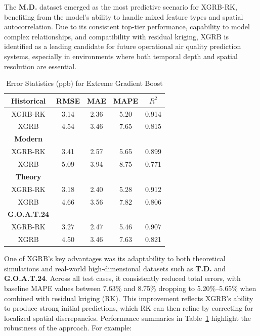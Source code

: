 The \textbf{M.D.} dataset emerged as the most predictive scenario for XGRB-RK, benefiting from the model’s ability to handle mixed feature types and spatial autocorrelation. Due to its consistent top-tier performance, capability to model complex relationships, and compatibility with residual kriging, XGRB is identified as a leading candidate for future operational air quality prediction systems, especially in environments where both temporal depth and spatial resolution are essential.
\begin{table}[h!]
    \centering
        \begin{tabular}{||c|cccc||}
            \hline
            \textbf{Historical} & \textbf{RMSE} & \textbf{MAE} & \textbf{MAPE} & \textbf{$R^{2}$} \\[3pt]
            \hline
            XGRB-RK & 3.14 & 2.36 &  5.20 & 0.914 \\[3pt]
              XGRB & 4.54 & 3.46 &  7.65 & 0.815 \\
            \hline
            \textbf{Modern}	&   &   &   &   \\[3pt]
            \hline
            XGRB-RK &  3.41 & 2.57 &  5.65 & 0.899 \\[3pt]
               XGRB &  5.09 & 3.94 &  8.75 & 0.771 \\
            \hline
            \textbf{Theory}	&   &   &   &   \\[3pt]
            \hline
            XGRB-RK & 3.18 & 2.40 &  5.28 & 0.912 \\[3pt]
              XGRB & 4.66 & 3.56 &  7.82 & 0.806 \\
            \hline
            \textbf{G.O.A.T.24}	&   &   &   &   \\[3pt]
            \hline
            XGRB-RK & 3.27 & 2.47 &  5.46 & 0.907 \\[3pt]
              XGRB & 4.50 & 3.46 &  7.63 & 0.821 \\
            \hline
        \end{tabular}
    \caption{Error Statistics (ppb) for Extreme Gradient Boost} 
    \label{tab:xgrb_model}
\end{table} One of XGRB’s key advantages was its adaptability to both theoretical simulations and real-world high-dimensional datasets such as \textbf{T.D.} and \textbf{G.O.A.T.24}. Across all test cases, it consistently reduced total errors, with baseline MAPE values between 7.63\% and 8.75\% dropping to 5.20\%–5.65\% when combined with residual kriging (RK). This improvement reflects XGRB’s ability to produce strong initial predictions, which RK can then refine by correcting for localized spatial discrepancies. Performance summaries in Table~\ref{tab:xgrb_model} highlight the robustness of the approach. For example:
